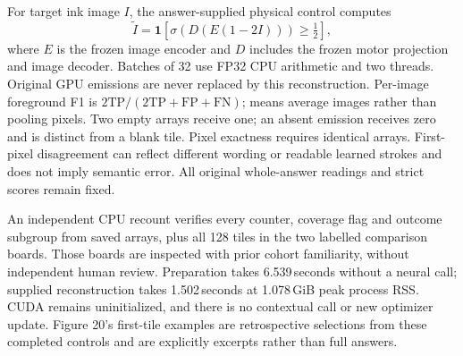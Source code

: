 For target ink image $I$, the answer-supplied physical control computes
\[
 \widetilde I=\mathbf 1\!\left[
 \sigma\!\left(D(E(1-2I))\right)\geq\tfrac12\right],
\]
where $E$ is the frozen image encoder and $D$ includes the frozen motor
projection and image decoder. Batches of 32 use FP32 CPU arithmetic and two
threads. Original GPU emissions are never replaced by this reconstruction.
Per-image foreground F1 is $2\mathrm{TP}/(2\mathrm{TP}+\mathrm{FP}+\mathrm{FN})$;
means average images rather than pooling pixels. Two empty arrays receive one;
an absent emission receives zero and is distinct from a blank tile. Pixel
exactness requires identical arrays. First-pixel disagreement can reflect
different wording or readable learned strokes and does not imply semantic
error. All original whole-answer readings and strict scores remain fixed.

An independent CPU recount verifies every counter, coverage flag and outcome
subgroup from saved arrays, plus all 128 tiles in the two labelled comparison
boards. Those boards are inspected with prior cohort familiarity, without
independent human review. Preparation takes 6.539\,seconds without a neural call;
supplied reconstruction takes 1.502\,seconds at 1.078\,GiB peak process RSS. CUDA
remains uninitialized, and there is no contextual call or new optimizer
update. Figure 20's first-tile examples are retrospective selections from
these completed controls and are explicitly excerpts rather than full answers.


